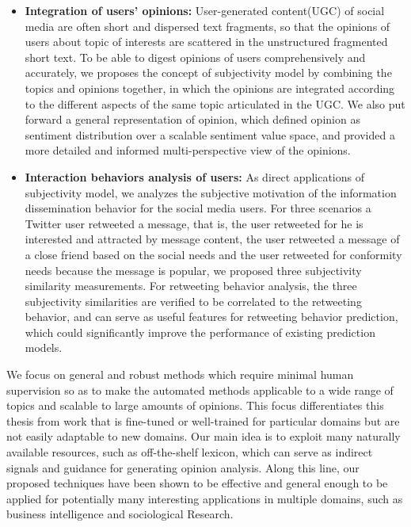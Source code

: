 \begin{eabstract}
\begin{itemize}
\item \textbf{Integration of users' opinions:} User-generated content(UGC) of social media are often short and dispersed text fragments, so that the opinions of users about topic of interests are scattered in the unstructured fragmented short text. To be able to digest opinions of users comprehensively and accurately, we proposes the concept of subjectivity model by combining the topics and opinions together, in which the opinions are integrated according to the different aspects of the same topic articulated in the UGC. We also put forward a general representation of opinion, which defined opinion as sentiment distribution over a scalable sentiment value space, and provided a more detailed and informed multi-perspective view of the opinions.
\item \textbf{Interaction behaviors analysis of users:} As direct applications of subjectivity model, we analyzes the subjective motivation of the information dissemination behavior for the social media users. For three scenarios a Twitter user retweeted a message, that is, the user retweeted for he is interested and attracted by message content, the user retweeted a message of a close friend based on the social needs and the user retweeted for conformity needs because the message is popular, we proposed three subjectivity similarity measurements. For retweeting behavior analysis, the three subjectivity similarities are verified to be correlated to the retweeting behavior, and can serve as useful features for retweeting behavior prediction, which could significantly improve the performance of existing prediction models.
\end{itemize}

We focus on general and robust methods which require minimal human supervision so as to make the automated methods applicable to a wide range of topics and scalable to large amounts of opinions. This focus differentiates this thesis from work that is fine-tuned or well-trained for particular domains but are not easily adaptable to new domains. Our main idea is to exploit many naturally available resources, such as off-the-shelf lexicon, which can serve as indirect signals and guidance for generating opinion analysis. Along this line, our proposed techniques have been shown to be effective and general enough to be applied for potentially many interesting applications in multiple domains, such as business intelligence and sociological Research.
\end{eabstract}

